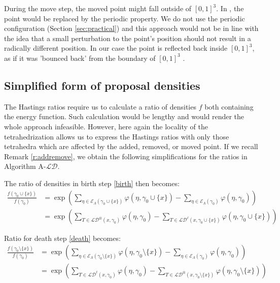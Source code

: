 

During the move step, the moved point might fall outside of $[0,1]^3$. In \cite{DereudreLavancier2010}, the point would be replaced by the periodic property. We do not use the periodic configuration (Section \ref{sec:practical}) and this approach would not be in line with the idea that a small perturbation to the point's position should not result in a radically different position. 
In our case the point is reflected back inside $[0,1]^3$, as if it was 'bounced back' from the boundary of $[0,1]^3$ .

\subsection{Simplified form of proposal densities}
The Hastings ratios require us to calculate a ratio of densities $f$ both containing the energy function. Such calculation would be lengthy and would render the whole approach infeasible. However, here again the locality of the tetrahedrization allows us to express the Hastings ratios with only those tetrahedra which are affected by the added, removed, or moved point. If we recall Remark \ref{r:addremove}, we obtain the following simplifications for the ratios in Algorithm A-$\mathcal {LD}$.

The ratio of densities in birth step \ref{birth} then becomes:
\begin{align*}
\frac{f(\gamma_0 \cup\{x\})}{f(\gamma_0)} &= \exp\left({\sum_{\eta\in \mathcal E_\Lambda(\gamma_0 \cup\{x\})} \varphi(\eta,\gamma_0 \cup\{x\}) - \sum_{\eta\in \mathcal E_\Lambda(\gamma_0)}\varphi(\eta,\gamma_0)}\right) \\
&= \exp\left(  \sum_{T \in \mathcal {LD}^\otimes (x,\gamma_0)} \varphi(\eta,\gamma_0)  - \sum_{T\in \mathcal {LD}^\ell (x,\gamma_0 \cup\{x\})} \varphi(\eta,\gamma_0 \cup\{x\}) \right)  
\end{align*}

Ratio for death step \ref{death} becomes:
\begin{align*}
\frac{f(\gamma_0 \setminus\{x\})}{f(\gamma_0)}&= \exp\left({\sum_{\eta\in \mathcal E_\Lambda(\gamma_0 \setminus\{x\})} \varphi(\eta,\gamma_0 \setminus\{x\})- \sum_{\eta\in \mathcal E_\Lambda(\gamma_0)}\varphi(\eta,\gamma_0)}\right)\\
&= \exp\left( \sum_{T\in \mathcal {LD}^\ell (x,\gamma_0)} \varphi(\eta,\gamma_0) - \sum_{T \in \mathcal {LD}^\otimes (x,\gamma_0 \setminus\{x\} )} \varphi(\eta,\gamma_0 \setminus\{x\})   \right)
\end{align*}

